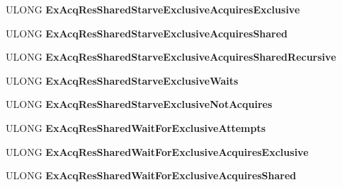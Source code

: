 \begin{DoxyCompactItemize}
\item 
\mbox{\label{struct___s_y_n_c_h___c_o_u_n_t_e_r_s_ad1fbfa6504139389da633275a997bbbb}} 
U\+L\+O\+NG {\bfseries Ex\+Acq\+Res\+Shared\+Starve\+Exclusive\+Acquires\+Exclusive}
\item 
\mbox{\label{struct___s_y_n_c_h___c_o_u_n_t_e_r_s_a952501c1ef45e61610f864480a454ec8}} 
U\+L\+O\+NG {\bfseries Ex\+Acq\+Res\+Shared\+Starve\+Exclusive\+Acquires\+Shared}
\item 
\mbox{\label{struct___s_y_n_c_h___c_o_u_n_t_e_r_s_a9375a93ee23e13f648f757614719ed7b}} 
U\+L\+O\+NG {\bfseries Ex\+Acq\+Res\+Shared\+Starve\+Exclusive\+Acquires\+Shared\+Recursive}
\item 
\mbox{\label{struct___s_y_n_c_h___c_o_u_n_t_e_r_s_a961274560bd5792581b4d33443e3d711}} 
U\+L\+O\+NG {\bfseries Ex\+Acq\+Res\+Shared\+Starve\+Exclusive\+Waits}
\item 
\mbox{\label{struct___s_y_n_c_h___c_o_u_n_t_e_r_s_a2d4e502e52e15feaef99ad1039e6a486}} 
U\+L\+O\+NG {\bfseries Ex\+Acq\+Res\+Shared\+Starve\+Exclusive\+Not\+Acquires}
\item 
\mbox{\label{struct___s_y_n_c_h___c_o_u_n_t_e_r_s_a7d2b2178d582ad205f00969e0b0ab1ad}} 
U\+L\+O\+NG {\bfseries Ex\+Acq\+Res\+Shared\+Wait\+For\+Exclusive\+Attempts}
\item 
\mbox{\label{struct___s_y_n_c_h___c_o_u_n_t_e_r_s_a5b39ca7dcff5d3290746e38c5b30d2ba}} 
U\+L\+O\+NG {\bfseries Ex\+Acq\+Res\+Shared\+Wait\+For\+Exclusive\+Acquires\+Exclusive}
\item 
\mbox{\label{struct___s_y_n_c_h___c_o_u_n_t_e_r_s_acfae5ebcc52f1d6170b338fd318f58b6}} 
U\+L\+O\+NG {\bfseries Ex\+Acq\+Res\+Shared\+Wait\+For\+Exclusive\+Acquires\+Shared}
\item 
\mbox{\label{struct___s_y_n_c_h___c_o_u_n_t_e_r_s_a3f0586d000106fbbe3deff83ebfe947c}} 

\end{DoxyCompactItemize}

